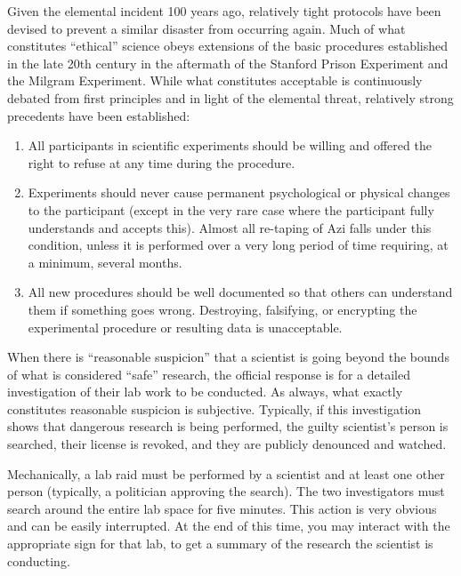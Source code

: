 \documentclass[green]{elementals}
\begin{document}
\name{\gEthics{}}

Given the elemental incident 100 years ago, relatively tight protocols have been devised to prevent a similar disaster from occurring again. Much of what constitutes ``ethical'' science obeys extensions of the basic procedures established in the late 20th century in the aftermath of the Stanford Prison Experiment and the Milgram Experiment. While what constitutes acceptable is continuously debated from first principles and in light of the elemental threat, relatively strong precedents have been established:

\begin{enumerate}
\item All participants in scientific experiments should be willing and offered the right to refuse at any time during the procedure.
\item Experiments should never cause permanent psychological or physical changes to the participant (except in the very rare case where the participant fully understands and accepts this). Almost all re-taping of Azi falls under this condition, unless it is performed over a very long period of time requiring, at a minimum, several months.
\item All new procedures should be well documented so that others can understand them if something goes wrong. Destroying, falsifying, or encrypting the experimental procedure or resulting data is unacceptable.
\end{enumerate}

When there is ``reasonable suspicion'' that a scientist is going beyond the bounds of what is considered ``safe'' research, the official response is for a detailed investigation of their lab work to be conducted. As always, what exactly constitutes reasonable suspicion is subjective. Typically, if this investigation shows that dangerous research is being performed, the guilty scientist's person is searched, their license is revoked, and they are publicly denounced and watched.

Mechanically, a lab raid must be performed by a scientist and at least one other person (typically, a politician approving the search). The two investigators must search around the entire lab space for five minutes. This action is very obvious and can be easily interrupted. At the end of this time, you may interact with the appropriate sign for that lab, to get a summary of the research the scientist is conducting.
\end{document}
